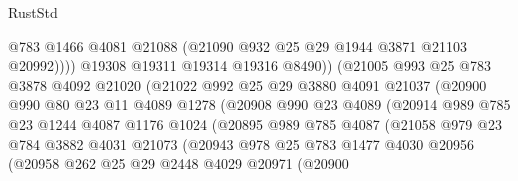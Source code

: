 \begin{lexlean}{RustStd}
\begin{coremodule}
                                @783
                                @1466
                                @4081
                                @21088
                                (@21090 @932 @25 @29 @1944 @3871 @21103 @20992))))
                          @19308
                          @19311
                          @19314
                          @19316
                          @8490))
                      (@21005
                        @993
                        @25
                        @783
                        @3878
                        @4092
                        @21020
                        (@21022
                          @992
                          @25
                          @29
                          @3880
                          @4091
                          @21037
                          (@20900
                            @990
                            @80
                            @23
                            @11
                            @4089
                            @1278
                            (@20908
                              @990
                              @23
                              @4089
                              (@20914
                                @989
                                @785
                                @23
                                @1244
                                @4087
                                @1176
                                @1024
                                (@20895
                                  @989
                                  @785
                                  @4087
                                  (@21058
                                    @979
                                    @23
                                    @784
                                    @3882
                                    @4031
                                    @21073
                                    (@20943
                                      @978
                                      @25
                                      @783
                                      @1477
                                      @4030
                                      @20956
                                      (@20958
                                        @262
                                        @25
                                        @29
                                        @2448
                                        @4029
                                        @20971
                                        (@20900

\end{coremodule}
\end{lexlean}
